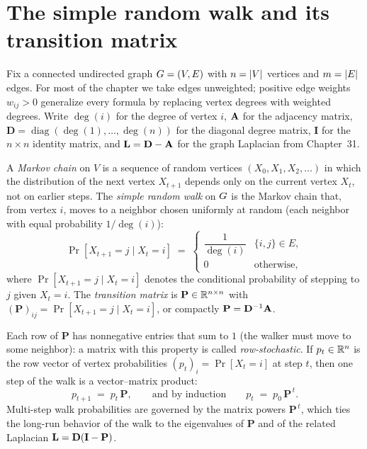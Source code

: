 \chapterline

\section{The simple random walk and its transition matrix}

Fix a connected undirected graph $G=(V,E)$ with $n=\lvert V\rvert$ vertices and $m=\lvert E\rvert$ edges. For most of the chapter we take edges unweighted; positive edge weights $w_{ij}>0$ generalize every formula by replacing vertex degrees with weighted degrees. Write $\deg(i)$ for the degree of vertex $i$, $\mathbf{A}$ for the adjacency matrix, $\mathbf{D}=\operatorname{diag}(\deg(1),\dots,\deg(n))$ for the diagonal degree matrix, $\mathbf{I}$ for the $n\times n$ identity matrix, and $\mathbf{L}=\mathbf{D}-\mathbf{A}$ for the graph Laplacian from Chapter~31.

\begin{definition}\label{ch35:def-srw}
A \emph{Markov chain} on $V$ is a sequence of random vertices $(X_0,X_1,X_2,\dots)$ in which the distribution of the next vertex $X_{t+1}$ depends only on the current vertex $X_t$, not on earlier steps. The \emph{simple random walk} on $G$ is the Markov chain that, from vertex $i$, moves to a neighbor chosen uniformly at random (each neighbor with equal probability $1/\deg(i)$):
\[
  \Pr[X_{t+1}=j \mid X_t=i] \;=\;
  \begin{cases} \dfrac{1}{\deg(i)} & \{i,j\}\in E,\\[6pt] 0 & \text{otherwise,}\end{cases}
\]
where $\Pr[X_{t+1}=j \mid X_t=i]$ denotes the conditional probability of stepping to $j$ given $X_t=i$. The \emph{transition matrix} is $\mathbf{P} \in \mathbb{R}^{n\times n}$ with $(\mathbf{P})_{ij}=\Pr[X_{t+1}=j\mid X_t=i]$, or compactly $\mathbf{P} = \mathbf{D}^{-1}\mathbf{A}$.
\end{definition}

Each row of $\mathbf{P}$ has nonnegative entries that sum to $1$ (the walker must move to some neighbor): a matrix with this property is called \emph{row-stochastic}. If $p_t \in \mathbb{R}^{n}$ is the row vector of vertex probabilities $(p_t)_i = \Pr[X_t=i]$ at step $t$, then one step of the walk is a vector--matrix product:
\[
  p_{t+1} \;=\; p_t \,\mathbf{P}, \qquad\text{and by induction}\qquad p_t \;=\; p_0\,\mathbf{P}^{\,t}.
\]
Multi-step walk probabilities are governed by the matrix powers $\mathbf{P}^{\,t}$, which ties the long-run behavior of the walk to the eigenvalues of $\mathbf{P}$ and of the related Laplacian $\mathbf{L} = \mathbf{D}(\mathbf{I}-\mathbf{P})$.

